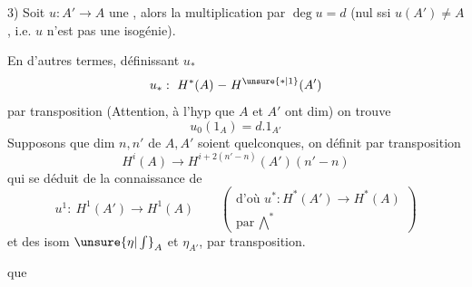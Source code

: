 3) Soit $u:A'\longrightarrow A$ une , alors
la multiplication par $\deg u=d$ (nul ssi $u(A')\ne A$, i.e. $u$ n'est pas une isogénie).

En d'autres termes, définissant $u_*$
\[
 u_*:\ H^{*}(A)\mathrel{-}H^{\unsure{*|1}}(A')
\]
par transposition (Attention, à l'hyp que $A$ et $A'$ ont  dim) on trouve
\[
 u_0(1_A)=d.1_{A'}
\]
Supposons que   dim $n,n'$ de $A,A'$ soient quelconques, on définit par transposition
\[
 H^i(A)\longrightarrow H^{i+2(n'-n)}(A')(n'-n)
\]
 qui se déduit  de la connaissance de
\[
 u^1:\ H^1(A')\longrightarrow H^1(A)
 \qquad\left(\begin{gathered}\text{d'où }u^*:H^*(A')\to H^*(A)\\ \text{par }\bigwedge\nolimits^*\end{gathered}\right)
\]
et des isom $\unsure{\eta|\int}_A$ et $\eta_{A'}$, par transposition.

 que

